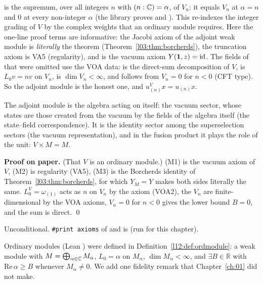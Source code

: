 \begin{dictionary}
 is the supremum, over all integers $n$ with $(n:{\mathbb{C}})=\alpha$, of $V_n$: it equals $V_n$ at $\alpha=n$ and $0$ at every
non-integer $\alpha$ (the library proves  and ). This re-indexes the integer grading of $V$ by the complex
weights that an ordinary module requires. Here the one-line proof terms are informative: the Jacobi axiom of the adjoint weak module is
\emph{literally} the theorem  (Theorem~\ref{l03:thm:borcherds}), the truncation axiom is VA5 (regularity), and
 is the vacuum axiom $Y(\mathbf{1},z)=\mathrm{id}$. The fields of  that were omitted use the VOA data:
 is the direct-sum decomposition of $V$,  is $L_0v=nv$ on $V_n$,  is $\dim V_n<\infty$, and
 follows from $V_n=0$ for $n<0$ (CFT type). So the adjoint module is the honest one, and
$u^V_{(n)}x = u_{(n)}x$.
\end{dictionary}

\begin{physics}
The adjoint module is the algebra acting on itself: the vacuum sector, whose states are those created from the vacuum by the fields of the
algebra itself (the state--field correspondence). It is the identity sector among the superselection sectors (the vacuum representation),
and in the fusion product it plays the role of the unit: $V\times M = M$.
\end{physics}

\textbf{Proof on paper.} (That $V$ is an ordinary module.) (M1) is the vacuum axiom of $V$, (M2) is regularity (VA5), (M3) is the Borcherds identity
of Theorem~\ref{l03:thm:borcherds}, for which $Y_M=Y$ makes both sides literally the same. $L_0^V=\omega_{(1)}$ acts as $n$ on $V_n$ by the
axiom (VOA2), the $V_n$ are finite-dimensional by the VOA axioms, $V_n=0$ for $n<0$ gives the lower bound $B=0$, and the sum is direct. \qed

\begin{status}
Unconditional. \texttt{\#print axioms} of  and  is
\lean{[propext, Classical.}\allowbreak{}\allowbreak\lean{sound]} (run for this chapter).
\end{status}

Ordinary modules (Lean ) were defined in Definition~\ref{l12:def:ordmodule}: a weak
module with $M = \bigoplus_{\alpha\in{\mathbb{C}}}M_\alpha$, $L_0 = \alpha$ on $M_\alpha$, $\dim M_\alpha<\infty$,
and $\exists B\in\mathbb R$ with $\mathrm{Re}\,\alpha\ge B$ whenever $M_\alpha\neq0$. We add one
fidelity remark that Chapter~\ref{ch:01} did not make.

